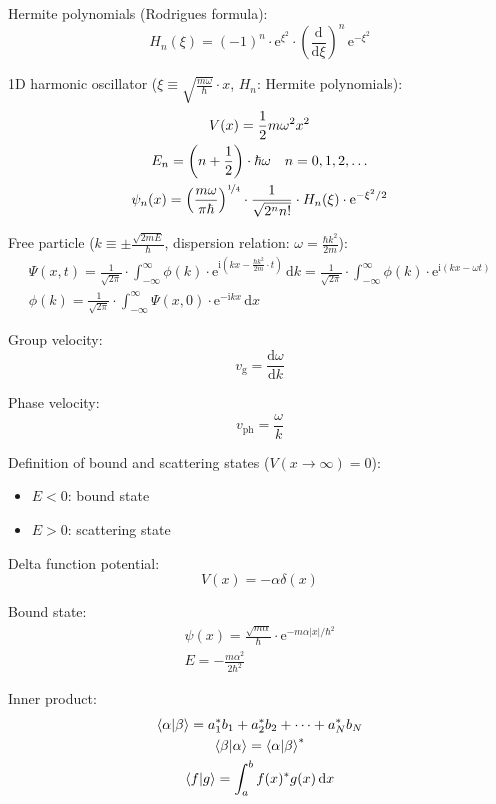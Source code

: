 \documentclass[fontsize=11pt,a4paper]{scrartcl}
\begin{document}
Hermite polynomials (Rodrigues formula):
\[
	H_n(\xi)=(-1)^n\cdot\mathrm{e}^{\xi^2}\cdot\left(\frac{\mathrm{d}}{\mathrm{d}\xi}\right)^n\,\mathrm{e}^{-\xi^2}
\]

1D harmonic oscillator ($\xi\equiv\sqrt{\frac{m\omega}{\hbar}}\cdot x$, $H_n$: Hermite polynomials):
\begin{gather*}
	V(x) = \frac{1}{2} m\omega^2 x^2\\
	E_n = \left(n+\frac{1}{2}\right)\cdot\hbar\omega\quad n=0,1,2,\dots\\
	\psi_n(x) = \left(\frac{m\omega}{\pi\hbar}\right)^{\nicefrac{1}{4}}\cdot\frac{1}{\sqrt{2^n n!}}\cdot
		H_n(\xi)\cdot\mathrm{e}^{-\xi^2/2}
\end{gather*}

Free particle ($k\equiv\pm\frac{\sqrt{2mE}}{\hbar}$, dispersion relation: $\omega=\frac{\hbar k^2}{2m}$):
\begin{gather*}
	\Psi(x,t)=\frac{1}{\sqrt{2\pi}}\cdot\int_{-\infty}^\infty \phi(k)\cdot
		\mathrm{e}^{\mathrm{i}\left(kx-\frac{\hbar k^2}{2m}\cdot t\right)}\,\mathrm{d}k
		=\frac{1}{\sqrt{2\pi}}\cdot\int_{-\infty}^\infty \phi(k)\cdot
		\mathrm{e}^{\mathrm{i}(kx-\omega t)}\\
	\phi(k)=\frac{1}{\sqrt{2\pi}}\cdot\int_{-\infty}^\infty \Psi(x,0)\cdot
		\mathrm{e}^{-\mathrm{i}kx}\,\mathrm{d}x
\end{gather*}

Group velocity:
\[
	v_\mathrm{g}=\frac{\mathrm{d}\omega}{\mathrm{d}k}
\]

Phase velocity:
\[
	v_\mathrm{ph}=\frac{\omega}{k}
\]

Definition of bound and scattering states ($V(x\to\infty)=0$):
\begin{itemize}
	\item $E<0$: bound state
	\item $E>0$: scattering state
\end{itemize}

Delta function potential:
\begin{equation*}
	V(x)=-\alpha\delta(x)
\end{equation*}

Bound state:
\begin{gather*}
	\psi(x)=\frac{\sqrt{m\alpha}}{\hbar}\cdot\mathrm{e}^{-m\alpha|x|/\hbar^2}\\
	E=-\frac{m\alpha^2}{2\hbar^2}
\end{gather*}

Inner product:
\begin{gather*}
	\braket{\alpha|\beta}=a_1^* b_1 + a_2^* b_2 + \dots + a_N^* b_N\\
	\braket{\beta|\alpha}=\braket{\alpha|\beta}^*\\
	\braket{f|g}=\int_a^b f(x)^* g(x)\,\mathrm{d}x
\end{gather*}
\end{document}
